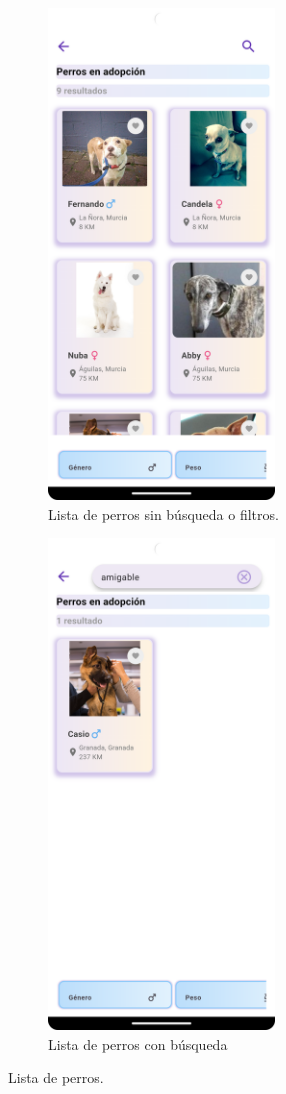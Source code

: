 \documentclass[a4paper, 12pt]{article}
\begin{document}
\begin{figure}[H]
   	\begin{subfigure}{0.48\textwidth}
		\begin{center}
			{\includegraphics[width=6cm]{app/DogList.png}\par}
			\caption{Lista de perros sin búsqueda o filtros.}
		\end{center}  
	\end{subfigure}\hfill
   	\begin{subfigure}{0.48\textwidth}
		\begin{center}
			{\includegraphics[width=6cm]{app/DogListSearch.png}\par}
			\caption{Lista de perros con búsqueda}
		\end{center}  
	\end{subfigure}\hfill
	\caption{Lista de perros.}
\end{figure}
\end{document}
